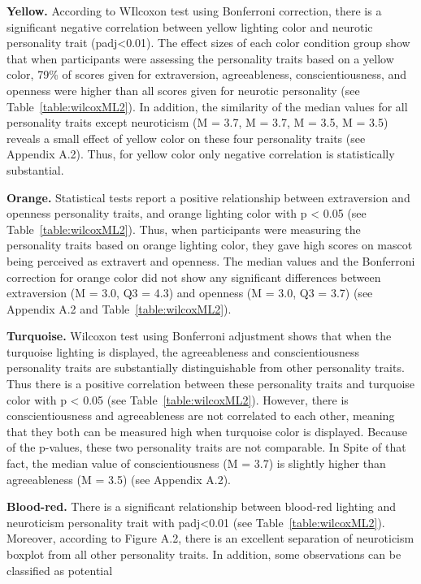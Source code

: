 \par \textbf{Yellow.} According to WIlcoxon test using Bonferroni correction, there is a significant negative
correlation between yellow lighting color and neurotic personality trait (padj<0.01). The effect sizes of each color
condition group show that when participants were assessing the personality traits based on a yellow color, 79\% of
scores given for extraversion, agreeableness, conscientiousness, and openness were higher than all scores given for
neurotic personality (see Table~\ref{table:wilcoxML2}). In addition, the similarity of the median values for all
personality traits except neuroticism (M = 3.7, M = 3.7, M = 3.5, M = 3.5) reveals a small effect of yellow color
on these four personality traits (see Appendix A.2). Thus, for yellow color only negative correlation is statistically substantial.
\par \textbf{Orange.} Statistical tests report a positive relationship between extraversion and openness personality
traits, and orange lighting color with p < 0.05 (see Table~\ref{table:wilcoxML2}). Thus, when participants were
measuring the personality traits based on orange lighting color, they gave high scores on mascot being perceived as
extravert and openness. The median values and the Bonferroni correction for orange color did not show any significant
differences between extraversion (M = 3.0, Q3 = 4.3) and openness (M = 3.0, Q3 = 3.7) (see Appendix A.2 and Table~\ref{table:wilcoxML2}).
\par \textbf{Turquoise.} Wilcoxon test using Bonferroni adjustment shows that when the turquoise lighting is displayed,
the agreeableness and conscientiousness personality traits are substantially distinguishable from other personality traits.
Thus there is a positive correlation between these personality traits and turquoise color with p < 0.05
(see Table~\ref{table:wilcoxML2}). However, there is conscientiousness and agreeableness are not correlated to each other,
meaning that they both can be measured high when turquoise color is displayed. Because of the p-values, these two
personality traits are not comparable. In Spite of that fact, the median value of conscientiousness (M = 3.7)
is slightly higher than agreeableness (M = 3.5) (see Appendix A.2).
\par \textbf{Blood-red.} There is a significant relationship between blood-red lighting and neuroticism personality
trait with padj<0.01 (see Table~\ref{table:wilcoxML2}). Moreover, according to Figure A.2, there is an excellent separation
of neuroticism boxplot from all other personality traits. In addition, some observations can be classified as potential

